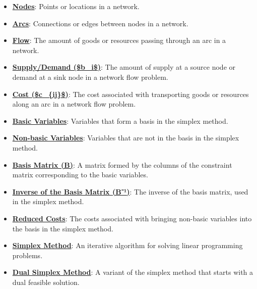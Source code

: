 \documentclass{article}%
\begin{document}
\begin{itemize}[leftmargin=*]
\item \href{https://www.math.purdue.edu/~yipn/421/2024-11-14-NetAppls.pdf#page=1}{\textbf{Nodes}}: Points or locations in a network.%
\item \href{https://www.math.purdue.edu/~yipn/421/2024-11-14-NetAppls.pdf#page=1}{\textbf{Arcs}}: Connections or edges between nodes in a network.%
\item \href{https://www.math.purdue.edu/~yipn/421/2024-11-14-NetAppls.pdf#page=2}{\textbf{Flow}}: The amount of goods or resources passing through an arc in a network.%
\item \href{https://www.math.purdue.edu/~yipn/421/2024-11-14-NetAppls.pdf#page=2}{\textbf{Supply/Demand (\$b\_i\$)}}: The amount of supply at a source node or demand at a sink node in a network flow problem.%
\item \href{https://www.math.purdue.edu/~yipn/421/2024-11-14-NetAppls.pdf#page=6}{\textbf{Cost (\$c\_\{ij\}\$)}}: The cost associated with transporting goods or resources along an arc in a network flow problem.%
\item \href{https://www.math.purdue.edu/~yipn/421/2024-11-14-NetAppls.pdf#page=2}{\textbf{Basic Variables}}: Variables that form a basis in the simplex method.%
\item \href{https://www.math.purdue.edu/~yipn/421/2024-11-14-NetAppls.pdf#page=2}{\textbf{Non{-}basic Variables}}: Variables that are not in the basis in the simplex method.%
\item \href{https://www.math.purdue.edu/~yipn/421/2024-11-14-NetAppls.pdf#page=7}{\textbf{Basis Matrix (B)}}: A matrix formed by the columns of the constraint matrix corresponding to the basic variables.%
\item \href{https://www.math.purdue.edu/~yipn/421/2024-11-14-NetAppls.pdf#page=7}{\textbf{Inverse of the Basis Matrix (B⁻¹)}}: The inverse of the basis matrix, used in the simplex method.%
\item \href{https://www.math.purdue.edu/~yipn/421/2024-11-14-NetAppls.pdf#page=7}{\textbf{Reduced Costs}}: The costs associated with bringing non-basic variables into the basis in the simplex method.%
\item \href{https://www.math.purdue.edu/~yipn/421/2024-11-14-NetAppls.pdf#page=7}{\textbf{Simplex Method}}: An iterative algorithm for solving linear programming problems.%
\item \href{https://www.math.purdue.edu/~yipn/421/2024-11-14-NetAppls.pdf#page=7}{\textbf{Dual Simplex Method}}: A variant of the simplex method that starts with a dual feasible solution.%

\end{itemize}
\end{document}
